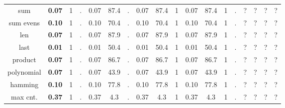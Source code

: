 \begin{table}
{\begin{tabular}[h]{|c| c|c|c|| c|c|c || c|c|c|| c|c|c|}
			\hline
			sum                        & {\bf 0.07}                  & 1                                         & .                                          & 0.07                                     & 87.4 & .          & 0.07   & 87.4 & 1          & 0.07   & 87.4 & 1 & .     & ? & ? & ? & ? \\
			sum evens                  & {\bf 0.10}                  & 1                                         & .                                          & 0.10                                     & 70.4 & .          & 0.10   & 70.4 & 1          & 0.10   & 70.4 & 1 & .     & ? & ? & ? & ? \\
			len                        & {\bf 0.07}                  & 1                                         & .                                          & 0.07                                     & 87.9 & .          & 0.07   & 87.9 & 1          & 0.07   & 87.9 & 1 & .     & ? & ? & ? & ? \\
			last                       & {\bf 0.01}                  & 1                                         & .                                          & 0.01                                     & 50.4 & .          & 0.01   & 50.4 & 1          & 0.01   & 50.4 & 1 & .     & ? & ? & ? & ? \\
			product                    & {\bf 0.07}                  & 1                                         & .                                          & 0.07                                     & 86.7 & .          & 0.07   & 86.7 & 1          & 0.07   & 86.7 & 1 & .     & ? & ? & ? & ? \\
			polynomial                 & {\bf 0.07}                  & 1                                         & .                                          & 0.07                                     & 43.9 & .          & 0.07   & 43.9 & 1          & 0.07   & 43.9 & 1 & .     & ? & ? & ? & ? \\
			hamming                    & {\bf 0.10}                  & 1                                         & .                                          & 0.10                                     & 77.8 & .          & 0.10   & 77.8 & 1          & 0.10   & 77.8 & 1 & .     & ? & ? & ? & ? \\
			max cnt.                   & {\bf 0.37}                  & 1                                         & .                                          & 0.37                                     & 4.3  & .          & 0.37   & 4.3  & 1          & 0.37   & 4.3  & 1 & .     & ? & ? & ? & ? \\

\end{tabular}}
\end{table}
